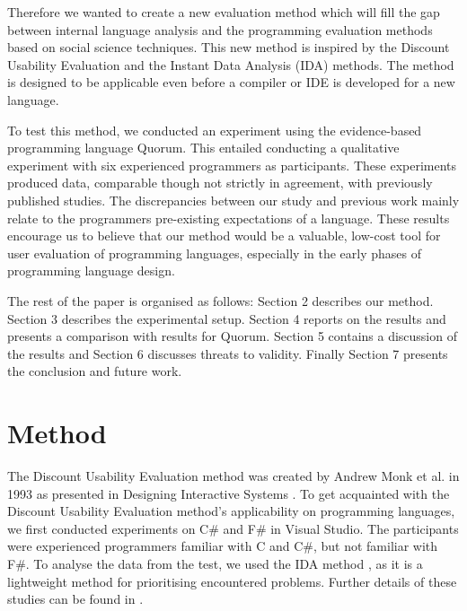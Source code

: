 \documentclass[preprint,10pt]{sigplanconf}
\begin{document}
Therefore we wanted to create a new evaluation method which will fill the gap between 
internal language analysis and the programming evaluation methods based on social science techniques. %
This new method is inspired by the Discount Usability Evaluation and the Instant Data Analysis (IDA) methods. %
The method is designed to be applicable even before a compiler or IDE is developed for a new language.

To test this method, we conducted an experiment using the evidence-based programming language Quorum. This entailed conducting a qualitative experiment with six experienced programmers as participants. These experiments 
produced data, comparable though not strictly in agreement, with previously published studies. The discrepancies between our study and previous work mainly relate to the programmers pre-existing expectations of a language. 
These results encourage us to believe that our method would be a valuable, low-cost tool for user evaluation of programming languages, especially in the early phases of programming language design.


The rest of the paper is organised as follows: Section 2 describes our method. Section 3 describes the experimental setup. Section 4 reports on the results and presents a comparison with results for Quorum. 
Section 5 contains a discussion of the results and Section 6 discusses threats to validity.
Finally Section 7 presents the conclusion and future work.


\section{Method}
The Discount Usability Evaluation method was created by Andrew Monk et al. in 1993 as presented in Designing Interactive Systems \cite{CooperativeEval}.
To get acquainted with the Discount Usability Evaluation method’s applicability on programming languages, we first conducted experiments on C\# and F\# in Visual Studio. The participants were experienced programmers familiar with C and C\#, but not familiar with F\#.  To analyse the data from the test, we used the IDA method \cite{IDA}, as it is a lightweight method for prioritising encountered problems.
Further details of these studies can be found in \cite{thesis}.
\end{document}

